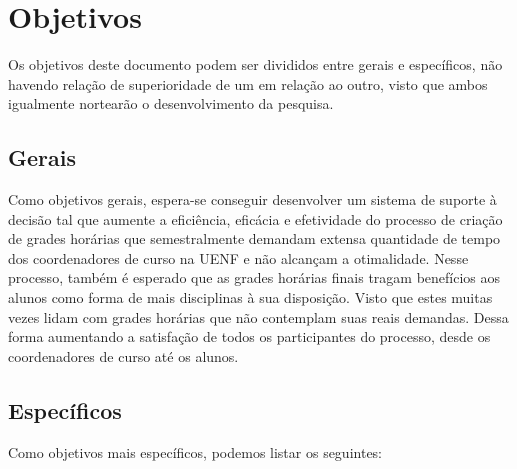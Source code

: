 
\section{Objetivos} %

Os objetivos deste documento podem ser divididos entre gerais e específicos, não havendo relação de superioridade de um em relação ao outro, visto que ambos igualmente nortearão o desenvolvimento da pesquisa.

\subsection{Gerais} %


Como objetivos gerais, espera-se conseguir desenvolver um sistema de suporte à decisão tal que aumente a eficiência, eficácia e efetividade do processo de criação de grades horárias que semestralmente demandam extensa quantidade de tempo dos coordenadores de curso na UENF e não alcançam a otimalidade. Nesse processo, também é esperado que as grades horárias finais tragam benefícios aos alunos como forma de mais disciplinas à sua disposição. Visto que estes muitas vezes lidam com grades horárias que não contemplam suas reais demandas. Dessa forma aumentando a satisfação de todos os participantes do processo, desde os coordenadores de curso até os alunos.

\subsection{Específicos} %

Como objetivos mais específicos, podemos listar os seguintes:

